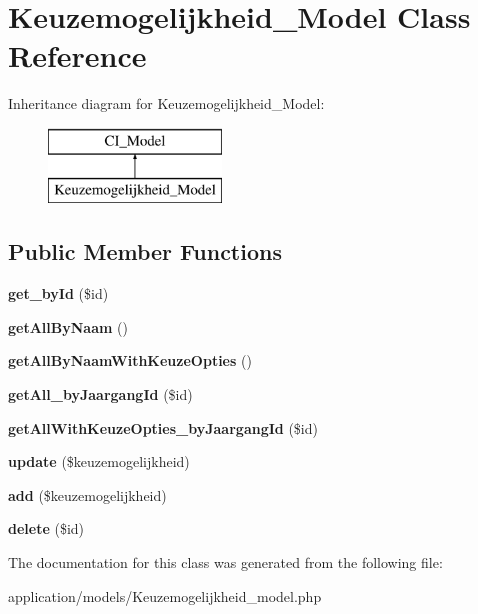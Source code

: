 \hypertarget{class_keuzemogelijkheid___model}{}\section{Keuzemogelijkheid\+\_\+\+Model Class Reference}
\label{class_keuzemogelijkheid___model}
Inheritance diagram for Keuzemogelijkheid\+\_\+\+Model\+:\begin{figure}[H]
\begin{center}
\leavevmode
\includegraphics[height=2.000000cm]{class_keuzemogelijkheid___model}
\end{center}
\end{figure}
\subsection*{Public Member Functions}
\begin{DoxyCompactItemize}
\item 
\mbox{\label{class_keuzemogelijkheid___model_a98d28a4d9a29d40c5a8aa0176f19a919}} 
{\bfseries get\+\_\+by\+Id} (\$id)
\item 
\mbox{\label{class_keuzemogelijkheid___model_a2b035b1ffd1cbe651b35bb3e53d72c09}} 
{\bfseries get\+All\+By\+Naam} ()
\item 
\mbox{\label{class_keuzemogelijkheid___model_a2762d72d382c5c81da0d0830d5d91805}} 
{\bfseries get\+All\+By\+Naam\+With\+Keuze\+Opties} ()
\item 
\mbox{\label{class_keuzemogelijkheid___model_aa7334b3aaafdacd36e91e44a83e668c3}} 
{\bfseries get\+All\+\_\+by\+Jaargang\+Id} (\$id)
\item 
\mbox{\label{class_keuzemogelijkheid___model_afee956c75c2fe9966783b18602ace19a}} 
{\bfseries get\+All\+With\+Keuze\+Opties\+\_\+by\+Jaargang\+Id} (\$id)
\item 
\mbox{\label{class_keuzemogelijkheid___model_a933a162ba87e58d4cc7eb781fd571a7a}} 
{\bfseries update} (\$keuzemogelijkheid)
\item 
\mbox{\label{class_keuzemogelijkheid___model_ab3ea46c3ea11cbb463eb98238e38c580}} 
{\bfseries add} (\$keuzemogelijkheid)
\item 
\mbox{\label{class_keuzemogelijkheid___model_a2f8258add505482d7f00ea26493a5723}} 
{\bfseries delete} (\$id)
\end{DoxyCompactItemize}


The documentation for this class was generated from the following file\+:\begin{DoxyCompactItemize}
\item 
application/models/Keuzemogelijkheid\+\_\+model.\+php\end{DoxyCompactItemize}
